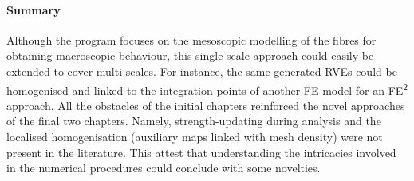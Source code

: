 	\paragraph{Summary} Although the program focuses on the mesoscopic modelling of the fibres for obtaining macroscopic behaviour, this single-scale approach could easily be extended to cover multi-scales. For instance, the same generated RVEs could be homogenised and linked to the integration points of another FE model for an FE\textsuperscript{2} approach. All the obstacles of the initial chapters reinforced the novel approaches of the final two chapters. Namely, strength-updating during analysis and the localised homogenisation (auxiliary maps linked with mesh density) were not present in the literature. This attest that understanding the intricacies involved in the numerical procedures could conclude with some novelties.





	 
\bl
